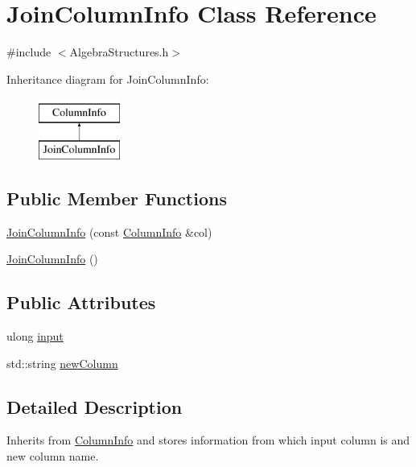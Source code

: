 \hypertarget{class_join_column_info}{\section{Join\+Column\+Info Class Reference}
\label{class_join_column_info}
}


{\ttfamily \#include $<$Algebra\+Structures.\+h$>$}

Inheritance diagram for Join\+Column\+Info\+:\begin{figure}[H]
\begin{center}
\leavevmode
\includegraphics[height=2.000000cm]{class_join_column_info}
\end{center}
\end{figure}
\subsection*{Public Member Functions}
\begin{DoxyCompactItemize}
\item 
\hyperlink{class_join_column_info_a87471f04a13b3b2a5ff4bd60065e18d9}{Join\+Column\+Info} (const \hyperlink{class_column_info}{Column\+Info} \&col)
\item 
\hyperlink{class_join_column_info_a6264c2ada06ad66c052657f00784e217}{Join\+Column\+Info} ()
\end{DoxyCompactItemize}
\subsection*{Public Attributes}
\begin{DoxyCompactItemize}
\item 
ulong \hyperlink{class_join_column_info_a6a87e51d648e21dd6806d7a1bd6191da}{input}
\item 
std\+::string \hyperlink{class_join_column_info_a4fdb28a84e69012cdb314463f9c0d674}{new\+Column}
\end{DoxyCompactItemize}


\subsection{Detailed Description}
Inherits from \hyperlink{class_column_info}{Column\+Info} and stores information from which input column is and new column name. 

